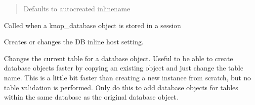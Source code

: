 \documentclass[letterpaper,10pt,english]{sphinxmanual}
\begin{document}
\begin{fulllineitems}
\begin{fulllineitems}
\begin{description}
\begin{itemize}
\begin{quote}
Defaults to autocreated inlinename
\end{quote}

\end{itemize}

\end{description}

\end{fulllineitems}


\begin{fulllineitems}
\label{knop_database:knop_database.serializationElements}
Called when a knop\_database object is stored in a session

\end{fulllineitems}


\begin{fulllineitems}
\label{knop_database:knop_database.sethost}
Creates or changes the DB inline host setting.

\end{fulllineitems}


\begin{fulllineitems}
\label{knop_database:knop_database.settable}
Changes the current table for a database object. Useful to be able to create
database objects faster by copying an existing object and just change the table
name. This is a little bit faster than creating a new instance from scratch, but
no table validation is performed. Only do this to add database objects for
tables within the same database as the original database object.

\end{fulllineitems}


\begin{fulllineitems}
\label{knop_database:knop_database.shown_count}
\end{fulllineitems}



\begin{fulllineitems}
\end{fulllineitems}


\end{fulllineitems}
\end{document}
